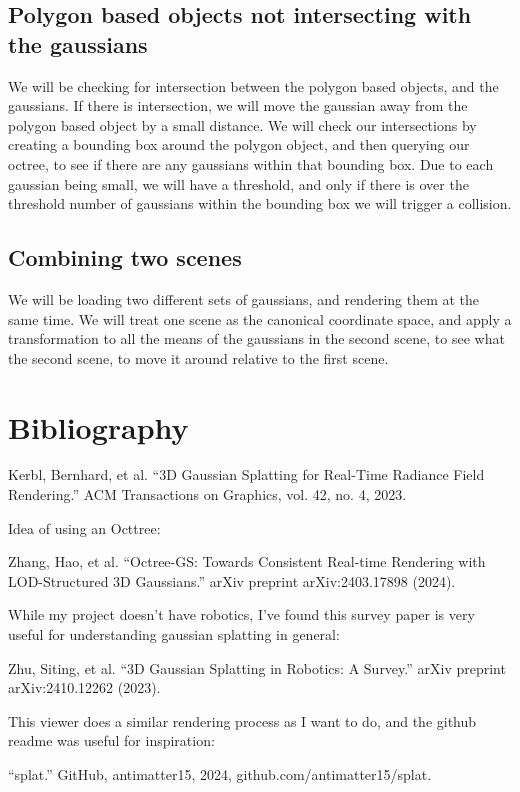\documentclass {article}
\begin{document}
\subsection{Polygon based objects not intersecting with the gaussians}

We will be checking for intersection between the polygon based objects, and the gaussians. If there is intersection, we will move the gaussian away from the polygon based object by a small distance. We will check our intersections by creating a bounding box around the polygon object, and then querying our octree, to see if there are any gaussians within that bounding box. Due to each gaussian being small, we will have a threshold, and only if there is over the threshold number of gaussians within the bounding box we will trigger a collision.


\subsection{Combining two scenes}

We will be loading two different sets of gaussians, and rendering them at the same time. We will treat one scene as the canonical coordinate space, and apply a transformation to all the means of the gaussians in the second scene, to see what the second scene, to move it around relative to the first scene.


\section{Bibliography}
     Kerbl, Bernhard, et al. “3D Gaussian Splatting for Real-Time Radiance Field Rendering.” ACM Transactions on Graphics, vol. 42, no. 4, 2023.

     Idea of using an Octtree:

     Zhang, Hao, et al. “Octree-GS: Towards Consistent Real-time Rendering with LOD-Structured 3D Gaussians.” arXiv preprint arXiv:2403.17898 (2024).


     While my project doesn't have robotics, I've found this survey paper is very useful for understanding gaussian splatting in general:

     Zhu, Siting, et al. “3D Gaussian Splatting in Robotics: A Survey.” arXiv preprint arXiv:2410.12262 (2023).

     This viewer does a similar rendering process as I want to do, and the github readme was useful for inspiration:

     “splat.” GitHub, antimatter15, 2024, github.com/antimatter15/splat.
\end{document}
